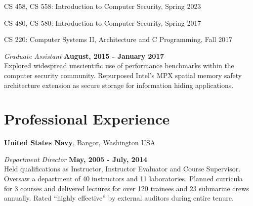 \documentclass[margin,line]{res}
\begin{document}
\begin{resume}
\vspace*{.05in}
\begin{list2}
\item CS 458, CS 558: Introduction to Computer Security, Spring 2023
\item CS 480, CS 580: Introduction to Computer Security, Spring 2017
\item CS 220: Computer Systems II, Architecture and C Programming, Fall 2017
\end{list2}

\vspace{-.1cm}
{\em Graduate Assistant} \hfill {\bf August, 2015 - January 2017}\\
Explored widespread unscientific use of performance benchmarks within the computer security community. Repurposed Intel's MPX spatial memory safety architecture extension as secure storage for information hiding applications.





\section{\sc Professional Experience}

{\bf United States Navy}, Bangor, Washington USA

\vspace{-.3cm}
{\em Department Director} \hfill {\bf May, 2005 - July, 2014}\\
Held qualifications as 
Instructor, Instructor Evaluator and Course Supervisor. Oversaw a department of 40 instructors and 11 laboratories. Planned curricula for 3 courses and delivered lectures for over 120 trainees and 23 submarine crews annually. Rated ``highly effective'' by external auditors during entire tenure.


\end{resume}
\end{document}

